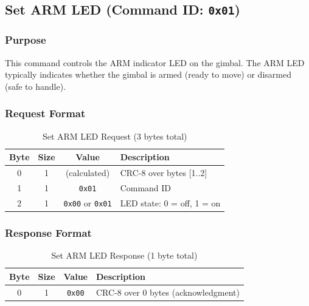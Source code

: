 \documentclass[12pt, titlepage]{article}
\begin{document}
\subsection{Set ARM LED (Command ID: \texttt{0x01})}

\subsubsection{Purpose}
This command controls the ARM indicator LED on the gimbal. The ARM LED
typically indicates whether the gimbal is armed (ready to move) or disarmed
(safe to handle).

\subsubsection{Request Format}

\begin{table}[H]
  \centering
  \begin{tabular}{cccl}
    \toprule
    \textbf{Byte} & \textbf{Size} & \textbf{Value}                 & \textbf{Description}       \\
    \midrule
    0             & 1             & (calculated)                   & CRC-8 over bytes [1..2]    \\
    1             & 1             & \texttt{0x01}                  & Command ID                 \\
    2             & 1             & \texttt{0x00} or \texttt{0x01} & LED state: 0 = off, 1 = on \\
    \bottomrule
  \end{tabular}
  \caption{Set ARM LED Request (3 bytes total)}
\end{table}

\subsubsection{Response Format}

\begin{table}[H]
  \centering
  \begin{tabular}{cccl}
    \toprule
    \textbf{Byte} & \textbf{Size} & \textbf{Value} & \textbf{Description}                \\
    \midrule
    0             & 1             & \texttt{0x00}  & CRC-8 over 0 bytes (acknowledgment) \\
    \bottomrule
  \end{tabular}
  \caption{Set ARM LED Response (1 byte total)}
\end{table}
\end{document}
